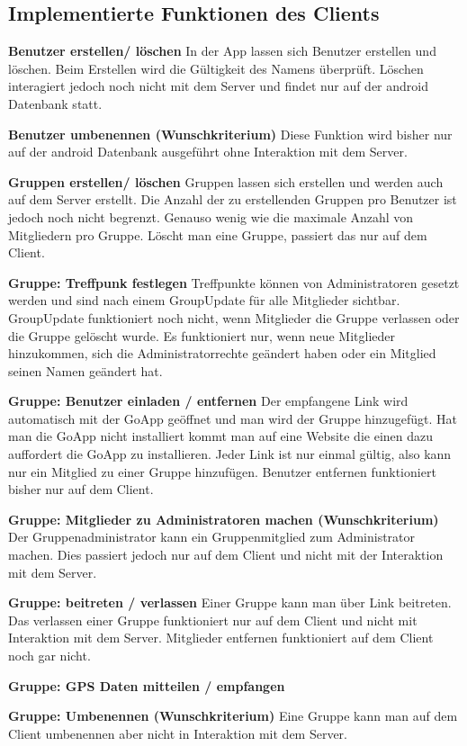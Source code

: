 \subsection{Implementierte Funktionen des Clients}

\textbf{Benutzer erstellen/ löschen}
In der App lassen sich Benutzer erstellen und löschen. Beim Erstellen wird die Gültigkeit des Namens überprüft. Löschen interagiert jedoch noch nicht mit dem Server und findet nur auf der android Datenbank statt.

\textbf{Benutzer umbenennen (Wunschkriterium)}
Diese Funktion wird bisher nur auf der android Datenbank ausgeführt ohne Interaktion mit dem Server.

\textbf{Gruppen erstellen/ löschen}
Gruppen lassen sich erstellen und werden auch auf dem Server erstellt. Die Anzahl der zu erstellenden Gruppen pro Benutzer ist jedoch noch nicht begrenzt. Genauso wenig wie die maximale Anzahl von Mitgliedern pro Gruppe. Löscht man eine Gruppe, passiert das nur auf dem Client.

\textbf{Gruppe: Treffpunk festlegen}
Treffpunkte können von Administratoren gesetzt werden und sind nach einem GroupUpdate für alle Mitglieder sichtbar. GroupUpdate funktioniert noch nicht, wenn Mitglieder die Gruppe verlassen oder die Gruppe gelöscht wurde. Es funktioniert nur, wenn neue Mitglieder hinzukommen, sich die Administratorrechte geändert haben oder ein Mitglied seinen Namen geändert hat.

\textbf{Gruppe: Benutzer einladen / entfernen}
Der empfangene Link wird automatisch mit der GoApp geöffnet und man wird der Gruppe hinzugefügt. Hat man die GoApp nicht installiert kommt man auf eine Website die einen dazu auffordert die GoApp zu installieren. Jeder Link ist nur einmal gültig, also kann nur ein Mitglied zu einer Gruppe hinzufügen. Benutzer entfernen funktioniert bisher nur auf dem Client.

\textbf{Gruppe: Mitglieder zu Administratoren machen (Wunschkriterium)}
Der Gruppenadministrator kann ein Gruppenmitglied zum Administrator machen. Dies passiert jedoch nur auf dem Client und nicht mit der Interaktion mit dem Server.

\textbf{Gruppe: beitreten / verlassen}
Einer Gruppe kann man über Link beitreten. Das verlassen einer Gruppe funktioniert nur auf dem Client und nicht mit Interaktion mit dem Server. Mitglieder entfernen funktioniert auf dem Client noch gar nicht.

\textbf{Gruppe: GPS Daten mitteilen / empfangen}


\textbf{Gruppe: Umbenennen (Wunschkriterium)}
Eine Gruppe kann man auf dem Client umbenennen aber nicht in Interaktion mit dem Server.
